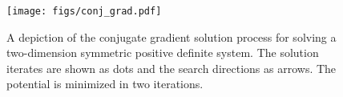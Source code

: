 \documentclass[../doc.tex]{subfiles}
\begin{document}
\begin{figure}
\centering
\texttt{[image: figs/conj\_grad.pdf]}
\caption{A depiction of the conjugate gradient solution process for solving a two-dimension symmetric positive definite system. The solution iterates are shown as dots and the search directions as arrows. The potential is minimized in two iterations.}
\label{fem:conj_grad_diag}
\end{figure}

\subsection{}
\end{document}
